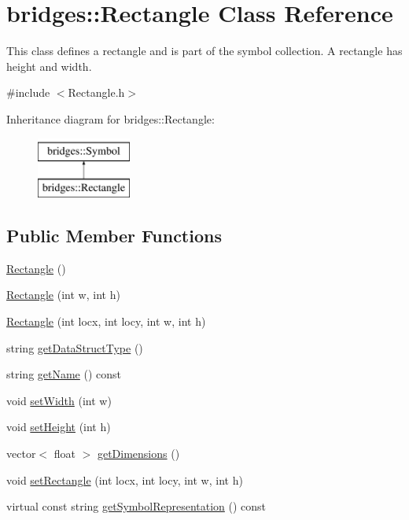 \hypertarget{classbridges_1_1_rectangle}{}\section{bridges\+:\+:Rectangle Class Reference}
\label{classbridges_1_1_rectangle}


This class defines a rectangle and is part of the symbol collection. A rectangle has height and width.  




{\ttfamily \#include $<$Rectangle.\+h$>$}

Inheritance diagram for bridges\+:\+:Rectangle\+:\begin{figure}[H]
\begin{center}
\leavevmode
\includegraphics[height=2.000000cm]{classbridges_1_1_rectangle}
\end{center}
\end{figure}
\subsection*{Public Member Functions}
\begin{DoxyCompactItemize}
\item 
\mbox{\hyperlink{classbridges_1_1_rectangle_a8d5b640b27372d32d7761769df343290}{Rectangle}} ()
\item 
\mbox{\hyperlink{classbridges_1_1_rectangle_ab5b67756e761bdd9515406874fbfb75a}{Rectangle}} (int w, int h)
\item 
\mbox{\hyperlink{classbridges_1_1_rectangle_a0f108bbf4b718aa2e1105383c10ab7d9}{Rectangle}} (int locx, int locy, int w, int h)
\item 
string \mbox{\hyperlink{classbridges_1_1_rectangle_a596586044a960de76ab95b859bf16235}{get\+Data\+Struct\+Type}} ()
\item 
string \mbox{\hyperlink{classbridges_1_1_rectangle_a78d234b0cb0e7263f2380b3a5f454178}{get\+Name}} () const
\item 
void \mbox{\hyperlink{classbridges_1_1_rectangle_ab592c45be7344b4a406d6332b392cb12}{set\+Width}} (int w)
\item 
void \mbox{\hyperlink{classbridges_1_1_rectangle_aa14d6619e60de1d660fa6f3770dfaaa7}{set\+Height}} (int h)
\item 
vector$<$ float $>$ \mbox{\hyperlink{classbridges_1_1_rectangle_a459587616a9674f6f0f02bac08589e23}{get\+Dimensions}} ()
\item 
void \mbox{\hyperlink{classbridges_1_1_rectangle_aee11bd9b9601d54c652b5b225c75bbac}{set\+Rectangle}} (int locx, int locy, int w, int h)
\item 
virtual const string \mbox{\hyperlink{classbridges_1_1_rectangle_a509c9489c6f145b684447851736acac5}{get\+Symbol\+Representation}} () const
\end{DoxyCompactItemize}
